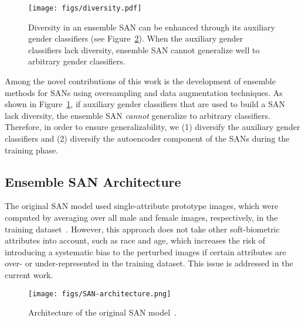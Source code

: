 \documentclass[10pt,twocolumn,letterpaper]{article}
\begin{document}
\begin{figure}
\begin{center}
   \texttt{[image: figs/diversity.pdf]}
\end{center}
   \caption{Diversity in an ensemble SAN can be enhanced through its auxiliary gender classifiers (see Figure~\ref{fig:san-arch}). When the auxiliary gender classifiers lack diversity, ensemble SAN cannot generalize well to arbitrary gender classifiers.}
\label{fig:diversity}
\end{figure}

Among the novel contributions of this work is the development of ensemble methods for SANs using oversampling and data augmentation techniques. As shown in Figure~\ref{fig:diversity}, if auxiliary gender classifiers that are used to build a SAN lack diversity, the ensemble SAN {\em cannot} generalize to arbitrary classifiers. Therefore, in order to ensure generalizability, we (1) diversify the auxiliary gender classifiers and (2) diversify the autoencoder component of the SANs during the training phase.

\subsection{Ensemble SAN Architecture}

The original SAN model used single-attribute prototype images, which were computed by averaging over all male and female images, respectively, in the training dataset~\cite{mirjalili_semi_2018}. 
However, this approach does not take other soft-biometric attributes into account, such as race and age, which increases the risk of introducing a systematic bias to the perturbed images if certain attributes are over- or under-represented in the training dataset. This issue is addressed in the current work. 

\begin{figure}
\begin{center}
   \texttt{[image: figs/SAN-architecture.png]}
\end{center}
   \caption{Architecture of the original SAN model~\cite{mirjalili_semi_2018}.}
\label{fig:san-arch}
\end{figure}
\end{document}
